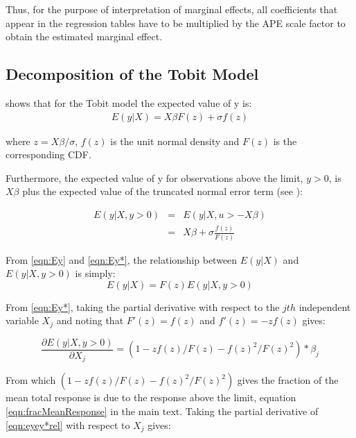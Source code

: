 \documentclass[11pt, oneside]{article}
\begin{document}
\begin{appendices}
		\noindent 
		Thus, for the purpose of interpretation of marginal effects, all coefficients that appear in the regression tables have to be multiplied by the APE scale factor to obtain the estimated marginal effect. 
		\vspace{3mm}
		
		\subsection{Decomposition of the Tobit Model}
		
		\noindent \cite{Tobin1958} shows that for the Tobit model the expected value of y is:
		\begin{eqnarray}
		E(y| X) = X \beta F(z) + \sigma f(z)
		\label{eqn:Ey}
		\end{eqnarray}
		
		
		where $z=X \beta/ \sigma$, $f(z)$ is the unit normal density and $F(z)$ is the corresponding CDF.
		
		\vspace{3mm}
		
		\noindent Furthermore, the expected value of y for observations above the limit, $y>0$, is $X \beta$ plus the expected value of the truncated normal error term (see \cite{Amemiya1973}):
		
		
		\begin{eqnarray}
		E(y|X, y>0)&=& E(y| X,u>-X \beta)\nonumber \\
		&=& X\beta + \sigma \frac{f(z)}{F(z)} \label{eqn:Ey*}
		\end{eqnarray}
		
		
		From \ref{eqn:Ey} and \ref{eqn:Ey*}, the relationship between $E(y|X)$ and $E(y|X,y>0)$ is simply:
		\begin{equation}
		E(y|X) = F(z)E(y|X, y>0)
		\label{eqn:eyey*rel}
		\end{equation}
		
		
		From \ref{eqn:Ey*}, taking the partial derivative with respect to the $jth$ independent variable  $X_j$ and noting that $F'(z) =  f(z)$ and $f'(z) = -zf(z)$ gives: 
		
		\begin{equation}
		\frac{\partial E(y|X,y>0)}{\partial X_j} = (1-zf(z)/F(z) - f(z)^2/F(z)^2)*\beta_j
		\label{eqn:EystarbyXi}
		\end{equation}
		
		
		\noindent From which $(1-zf(z)/F(z) - f(z)^2/F(z)^2)$ gives the fraction of the mean total response is due to the response above the limit, equation \ref{eqn:fracMeanResponse} in the main text.
		Taking the partial derivative of \ref{eqn:eyey*rel} with respect to $X_j$ gives: 
		

\end{appendices}
\end{document}
